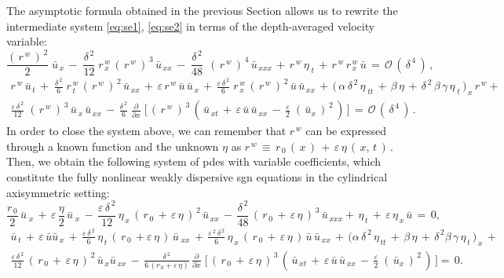 \documentclass[alpha-refs, 12pt]{wiley-article}
\renewcommand{\O}{\mathcal{O}}
\newcommand{\eps}{\varepsilon}
\begin{document}
The asymptotic formula obtained in the previous Section allows us to rewrite the intermediate system \eqref{eq:se1}, \eqref{eq:se2} in terms of the depth-averaged velocity variable:
\begin{equation*}
  \frac{(\,r^{\,w}\,)^{\,2}}{2}\;\bar{u}_{\,x}\,-\;\frac{\delta^{\,2}}{12}\;r^{\,w}_{\,x}\,(\,r^{\,w}\,)^{\,3}\,\bar{u}_{\,xx}\,-\;\frac{\delta^{\,2}}{48}\;\,(\,r^{\,w}\,)^{\,4}\,\bar{u}_{\,xxx}\,+\,r^{\,w}\,\eta_{\;t}\,+\,r^{\,w}\,r^{\,w}_{\,x}\,\bar{u}\,=\,\O\,(\,\delta^{\,4}\,)\,,
\end{equation*}
\begin{multline*}
  r^{\,w}\,\bar{u}_{\,t}\,+\;\frac{\delta^{\,2}}{6}\;r^{\,w}_{\,t}\,(\,r^{\,w}\,)^{\,2}\,\bar{u}_{\,xx}\,+\,\eps\, r^{\,w}\,\bar{u}\,\bar{u}_{\,x}\,+\,\frac{\eps\,\delta^{\,2}}{6}\;r^{\,w}_{\,x}\,(\,r^{\,w}\,)^{\,2}\,\bar{u}\,\bar{u}_{\,xx}\,+\,\bigl(\,\alpha\,\delta^{\,2}\,\eta_{\;tt}\,+\,\beta\,\eta\, +\,\delta^{\,2}\,\beta\,\gamma\,\eta_{\;t}\,\bigr)_{\,x}\,r^{\,w}
   +\\
   \frac{\eps\,\delta^{\,2}}{12}\;(\,r^{\,w}\,)^{\,3}\,\bar{u}_{\,x}\,\bar{u}_{\,xx}\,-\,\frac{\delta^{\,2}}{6}\;\frac{\partial}{\partial x}\;\bigl[ \,(\,r^{\,w}\,)^{\,3}\,(\,\bar{u}_{\,xt}\,+\,\eps\,\bar{u}\,\bar{u}_{\,xx}\,-\,\frac{\eps}{2}\;(\,\bar{u}_{x}\,)^{\,2}\,)\,\bigr]\,=\,\O\,(\,\delta^{\,4}\,)\,.
\end{multline*}
In order to close the system above, we can remember that $r^{\,w}$ can be expressed through a known function and the unknown $\eta$ as $r^{\,w}\,\equiv\, r_{\,0}\,(\,x\,)\,+\,\eps\,\eta\,(\,x,\,t\,)\,$. Then, we obtain the following system of \acrshort{pde}s with variable coefficients, which constitute the fully nonlinear weakly dispersive \acrfull{sgn} equations in the cylindrical axisymmetric setting:
\begin{equation}\label{eq:sgn1}
  \frac{r_{\,0}}{2}\,\bar{u}_{\;x} \,+\,\eps\,\frac{\eta}{2}\,\bar{u}_{\;x}\,-\,\frac{\eps\,\delta^{\,2}}{12}\,\eta_{\,x}\,(\,r_{\,0}\,+\,\eps\,\eta\,)^{\,2}\,\bar{u}_{\,xx}\,-\,\frac{\delta^{\,2}}{48}\,(\,r_{\,0}\,+\,\eps\,\eta\,)^{\,3}\,\bar{u}_{\,xxx}+\,\eta_{\,t} \,+\,\eps\,\eta_{\,x}\,\bar{u}\,=\,0,
\end{equation}
\begin{multline}\label{eq:sgn2}
  \bar{u}_{\,t}\,+\,\eps\,\bar{u}\bar{u}_{\,x}\,+\,\frac{\eps\,\delta^{\,2}}{6}\,\eta_{\,t}\,(\,r_{\,0}\,+\eps\,\eta\,)\,\bar{u}_{\;xx}\,+\,\frac{\eps^{\,2}\,\delta^{\,2}}{6}\,\eta_{\,x}\,(\,r_{\,0}\,+\,\eps\,\eta\,)\,\bar{u}\,\bar{u}_{\,xx}\,+\,\biggl(\alpha\,\delta^{\,2}\,\eta_{\,tt}\,+\,\beta\,\eta\,+\,\delta^{\,2}\beta\,\gamma\,\eta_{\,t}\,\biggr)_{\,x}\,+\\
  \frac{\eps\,\delta^{\,2}}{12}\,(\,r_{\,0}\,+\,\eps\,\eta\,)^{\,2}\,\bar{u}_{\,x}\bar{u}_{\,xx}\,-\,\frac{\delta^{\,2}}{6\,(r_{\,0}+\eps\,\eta)}\,\frac{\partial}{\partial x}\;\biggl[ \,(\,r_{\,0}\,+\,\eps\,\eta\,)^{\,3}\,(\,\bar{u}_{\,xt}\,+\,\eps\,\bar{u}\,\bar{u}_{\,xx}\,-
\,\frac{\eps}{2}\;(\,\bar{u}_{x}\,)^{\,2}\,)\,\biggr]=\,0.
\end{multline}
\end{document}
